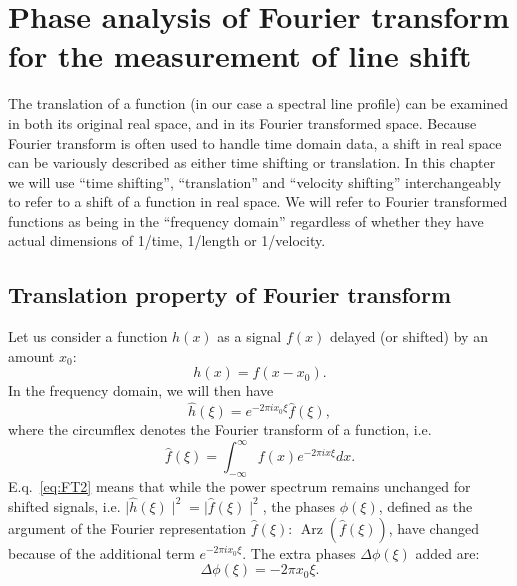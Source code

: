 \pagebreak

\section{Phase analysis of Fourier transform for the measurement of line shift}
\label{\thesection}
\label{ch:FT_line_shift}

The translation of a function (in our case a spectral line profile) can be examined in both its original real
space, and in its Fourier transformed space. Because Fourier transform is often used to handle time domain data,
a shift in real space can be variously described as either time shifting or translation. In this chapter 
we will use ``time shifting'', ``translation'' and ``velocity shifting'' interchangeably to refer to a shift of a function in real space. We will refer to Fourier transformed functions as being in the ``frequency domain'' regardless of whether they have actual dimensions of 1/time, 1/length or 1/velocity.

\subsection{Translation property of Fourier transform}

Let us consider a function $h(x)$ as a signal $f(x)$ delayed (or shifted) by an amount $x_0$:
\begin{equation}
	h(x) = f(x-x_0).
\label{eq:FT1}
\end{equation}
In the frequency domain, we will then have 
\begin{equation}
	\hat{h}(\xi) = e^{-2 \pi ix_0 \xi} \hat{f}(\xi),
\label{eq:FT2}
\end{equation}
where the circumflex denotes the Fourier transform of a function, i.e.
\begin{equation}
	\hat{f}(\xi) = \int_{-\infty}^{\infty} f(x) e^{-2 \pi ix \xi} dx.
\label{eq:FT3}
\end{equation}
E.q.~\ref{eq:FT2} means that while the power spectrum remains unchanged for shifted signals, i.e. $\mid \hat{h}(\xi)\mid ^2 = \mid\hat{f}(\xi)\mid^2$, the phases $\phi(\xi)$, defined as the argument of the Fourier representation $\hat{f}(\xi)$:  $\operatorname{Arz}(\hat{f}(\xi))$, have changed because of the additional term $e^{-2 \pi ix_0 \xi}$. The extra phases $\Delta \phi(\xi)$ added are: 
\begin{equation}
	\Delta \phi(\xi) = -2 \pi x_0 \xi.
\label{eq:PhaseShift}
\end{equation}

